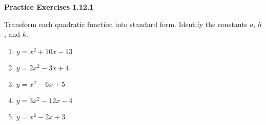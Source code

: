 \vspace{1ex}
\noindent\textbf{Practice Exercises 1.12.1}

\vspace{0.75ex}

Transform each quadratic function into standard form. Identify the constants $a$, 
 $h$, and $k$.
\begin{multicols}{2}
\begin{enumerate}[label = \color{blue}\arabic*. ]
\item $ y = x^{2} + 10x - 13 $
\item $ y = 2x^{2} - 3x + 4 $ 
\item $ y = x^{2} - 6x + 5 $
\item $ y = 3x^{2} - 12x - 4 $
\item $ y = x^{2} - 2x + 3 $
\end{enumerate}
\end{multicols} 

